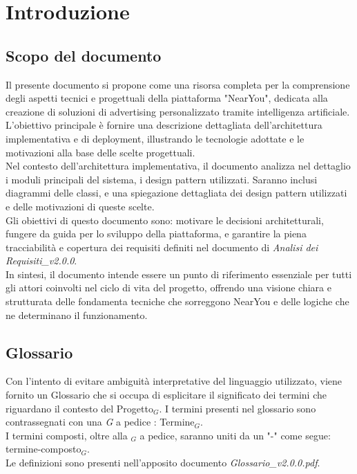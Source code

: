 \documentclass[10pt]{article}
\begin{document}
\newpage
\tableofcontents
\newpage
\listoffigures %
\newpage
\listoftables %
\newpage

\section{Introduzione}
\subsection{Scopo del documento}
Il presente documento si propone come una risorsa completa per la comprensione degli aspetti tecnici e progettuali della piattaforma "NearYou", dedicata alla
creazione di soluzioni di advertising personalizzato tramite intelligenza artificiale. L’obiettivo principale è fornire una descrizione dettagliata dell’architettura
implementativa e di deployment, illustrando le tecnologie adottate e le motivazioni alla base delle scelte progettuali.\\
Nel contesto dell'architettura implementativa, il documento analizza nel dettaglio i moduli principali del sistema, i design pattern utilizzati. Saranno inclusi
diagrammi delle classi, e una spiegazione dettagliata dei design pattern utilizzati e delle motivazioni di queste scelte.\\
Gli obiettivi di questo documento sono: motivare le decisioni architetturali, fungere da guida per lo sviluppo della piattaforma, e garantire la piena tracciabilità e
copertura dei requisiti definiti nel documento di \textit{Analisi dei Requisiti\_v2.0.0}.\\
In sintesi, il documento intende essere un punto di riferimento essenziale per tutti gli attori coinvolti nel ciclo di vita del progetto, offrendo una visione chiara e
strutturata delle fondamenta tecniche che sorreggono NearYou e delle logiche che ne determinano il funzionamento.\\

\subsection{Glossario}
Con l'intento di evitare ambiguità interpretative del linguaggio utilizzato, viene fornito un Glossario che si occupa di esplicitare il significato dei termini che riguardano il contesto del Progetto$_G$. I termini presenti nel glossario sono contrassegnati con una \textit{G} a pedice : Termine$_G$.\\
I termini composti, oltre alla $_G$ a pedice, saranno uniti da un "-" come segue: termine-composto$_G$.\\
Le definizioni sono presenti nell'apposito documento \textit{Glossario\_v2.0.0.pdf}.
\end{document}

